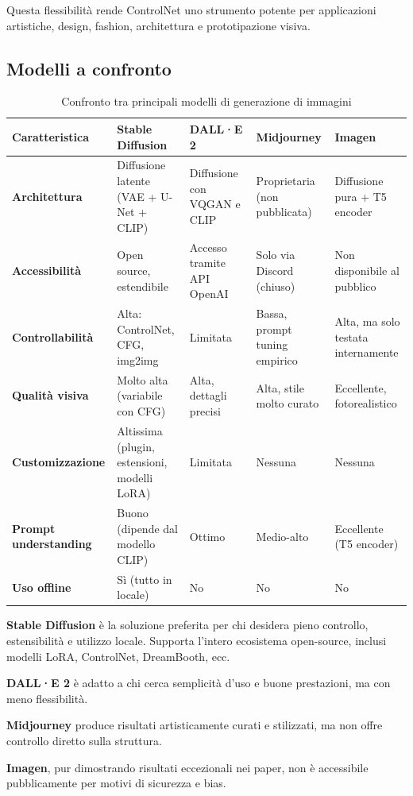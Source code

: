 Questa flessibilità rende ControlNet uno strumento potente per applicazioni artistiche, design, fashion, architettura e prototipazione visiva.

\subsection*{Modelli a confronto}

\begin{table}
    \centering
    \caption{Confronto tra principali modelli di generazione di immagini}
    \begin{tabularx}{\textwidth}{|l|X|X|X|X|}
    \hline
    \textbf{Caratteristica} & \textbf{Stable Diffusion} & \textbf{DALL·E 2} & \textbf{Midjourney} & \textbf{Imagen} \\
    \hline
    \textbf{Architettura} & Diffusione latente (VAE + U-Net + CLIP) & Diffusione con VQGAN e CLIP & Proprietaria (non pubblicata) & Diffusione pura + T5 encoder \\
    \hline
    \textbf{Accessibilità} & Open source, estendibile & Accesso tramite API OpenAI & Solo via Discord (chiuso) & Non disponibile al pubblico \\
    \hline
    \textbf{Controllabilità} & Alta: ControlNet, CFG, img2img & Limitata & Bassa, prompt tuning empirico & Alta, ma solo testata internamente \\
    \hline
    \textbf{Qualità visiva} & Molto alta (variabile con CFG) & Alta, dettagli precisi & Alta, stile molto curato & Eccellente, fotorealistico \\
    \hline
    \textbf{Customizzazione} & Altissima (plugin, estensioni, modelli LoRA) & Limitata & Nessuna & Nessuna \\
    \hline
    \textbf{Prompt understanding} & Buono (dipende dal modello CLIP) & Ottimo & Medio-alto & Eccellente (T5 encoder) \\
    \hline
    \textbf{Uso offline} & Sì (tutto in locale) & No & No & No \\
    \hline
\end{tabularx}
\end{table}


\begin{Osservazione}
    \textbf{Stable Diffusion} è la soluzione preferita per chi desidera pieno controllo, estensibilità e utilizzo locale. Supporta l’intero ecosistema open-source, inclusi modelli LoRA, ControlNet, DreamBooth, ecc.
\end{Osservazione}
\begin{Osservazione}
    \textbf{DALL·E 2} è adatto a chi cerca semplicità d’uso e buone prestazioni, ma con meno flessibilità.
\end{Osservazione}
\begin{Osservazione}
    \textbf{Midjourney} produce risultati artisticamente curati e stilizzati, ma non offre controllo diretto sulla struttura.
\end{Osservazione}
\begin{Osservazione}
    \textbf{Imagen}, pur dimostrando risultati eccezionali nei paper, non è accessibile pubblicamente per motivi di sicurezza e bias.
\end{Osservazione}

